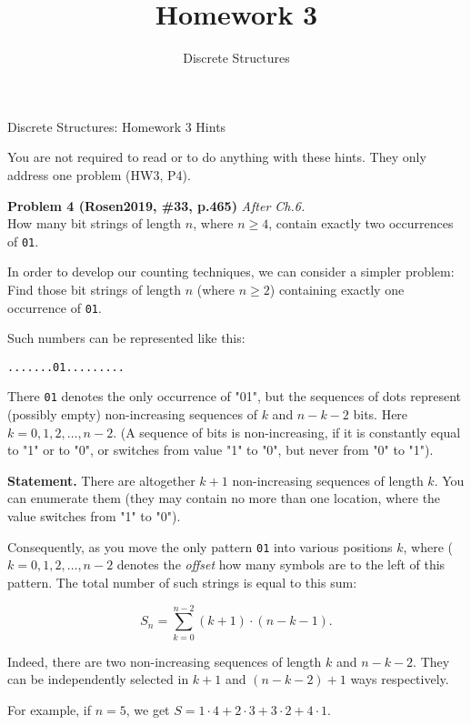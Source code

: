 \documentclass[jou]{apa6}
\title{Homework 3}
\author{Discrete Structures}
\affiliation{RBS}
\begin{document}


\thispagestyle{empty}

\twocolumn
{\Large Discrete Structures: Homework 3 Hints}

You are not required to read or to do anything with these hints. 
They only address one problem (HW3, P4). 


\vspace{8pt}
{\bf Problem 4 (Rosen2019, \#33, p.465)} \textendash{} {\em After Ch.6.}\\
How many bit strings of length $n$, where $n \geq 4$, contain exactly two 
occurrences of {\tt 01}.

In order to develop our counting techniques, we can consider a simpler problem: 
Find those bit strings of length $n$ (where $n \geq 2$) containing exactly one 
occurrence of {\tt 01}. 

Such numbers can be represented like this: 
\begin{verbatim}
.......01.........
\end{verbatim}
There {\tt 01} denotes the only occurrence of "01", but the sequences of 
dots represent (possibly empty) non-increasing sequences of $k$ and $n-k-2$ bits. 
Here $k = 0,1,2,\ldots,n-2$. 
(A sequence of bits is non-increasing, if it is constantly equal to "1" or to "0", or switches from 
value "1" to "0", but never from "0" to "1"). 

{\bf Statement.} 
There are altogether $k+1$ non-increasing sequences of length $k$. 
You can enumerate them (they may contain no more than one location, where the value switches from "1" to "0"). 

Consequently, as you move the only pattern {\tt 01} into various positions $k$, where 
($k = 0,1,2,\ldots,n-2$ denotes the {\em offset} \textendash{} how many symbols are to the left 
of this pattern. 
The total number of such strings is equal to this sum:

\begin{equation}
\label{eq1}
S_n = \sum\limits_{k=0}^{n-2} (k+1)\cdot(n-k-1).
\end{equation}


Indeed, there are two non-increasing sequences of length $k$ and $n-k-2$. 
They can be independently selected in $k+1$ and $(n-k-2)+1$ ways respectively. 

For example, if $n=5$, we get $S = 1 \cdot 4 + 2 \cdot 3 + 3 \cdot 2 + 4 \cdot 1$. 
\end{document}
